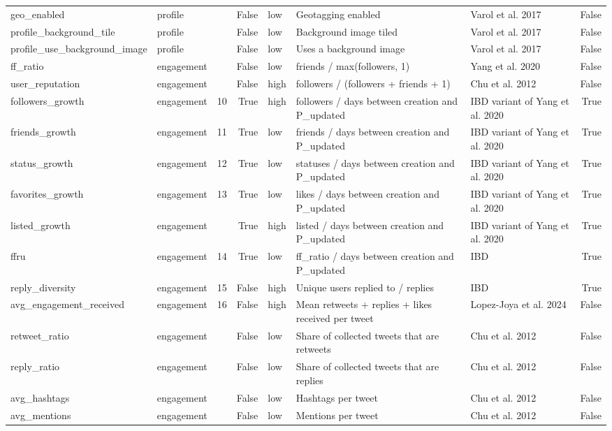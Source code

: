 \begin{tabular}{lllrlllr}
geo_enabled & profile &  & False & low & Geotagging enabled & Varol et al. 2017 & False \\
profile_background_tile & profile &  & False & low & Background image tiled & Varol et al. 2017 & False \\
profile_use_background_image & profile &  & False & low & Uses a background image & Varol et al. 2017 & False \\
ff_ratio & engagement &  & False & low & friends / max(followers, 1) & Yang et al. 2020 & False \\
user_reputation & engagement &  & False & high & followers / (followers + friends + 1) & Chu et al. 2012 & False \\
followers_growth & engagement & 10 & True & high & followers / days between creation and P_updated & IBD variant of Yang et al. 2020 & True \\
friends_growth & engagement & 11 & True & low & friends / days between creation and P_updated & IBD variant of Yang et al. 2020 & True \\
status_growth & engagement & 12 & True & low & statuses / days between creation and P_updated & IBD variant of Yang et al. 2020 & True \\
favorites_growth & engagement & 13 & True & low & likes / days between creation and P_updated & IBD variant of Yang et al. 2020 & True \\
listed_growth & engagement &  & True & high & listed / days between creation and P_updated & IBD variant of Yang et al. 2020 & True \\
ffru & engagement & 14 & True & low & ff_ratio / days between creation and P_updated & IBD & True \\
reply_diversity & engagement & 15 & False & high & Unique users replied to / replies & IBD & True \\
avg_engagement_received & engagement & 16 & False & high & Mean retweets + replies + likes received per tweet & Lopez-Joya et al. 2024 & False \\
retweet_ratio & engagement &  & False & low & Share of collected tweets that are retweets & Chu et al. 2012 & False \\
reply_ratio & engagement &  & False & low & Share of collected tweets that are replies & Chu et al. 2012 & False \\
avg_hashtags & engagement &  & False & low & Hashtags per tweet & Chu et al. 2012 & False \\
avg_mentions & engagement &  & False & low & Mentions per tweet & Chu et al. 2012 & False \\

\end{tabular}
